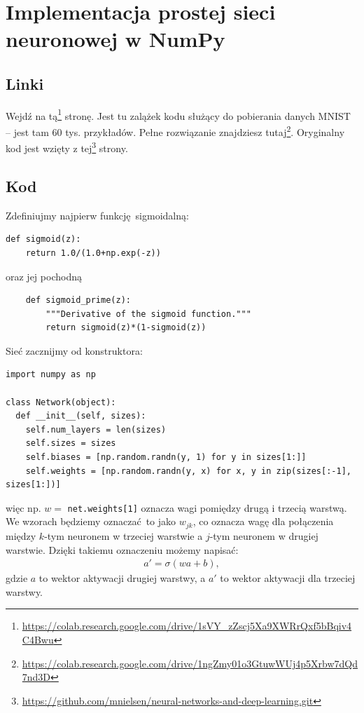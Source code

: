 \documentclass[10pt, oneside]{article}
\theoremstyle{remark}
\begin{document}
\section{Implementacja prostej sieci neuronowej w NumPy}
\subsection{Linki}
Wejdź na tą\footnote{\url{https://colab.research.google.com/drive/1sVY_zZscj5Xa9XWRrQxf5bBqiv4C4Bwu}} stronę. 
Jest tu zalążek kodu służący do pobierania danych MNIST -- jest tam 60 tys. przykładów.
Pełne rozwiązanie znajdziesz tutaj\footnote{\url{https://colab.research.google.com/drive/1ngZmy01o3GtuwWUj4p5Xrbw7dQd7nd3D}}.
Oryginalny kod jest wzięty z tej\footnote{\url{https://github.com/mnielsen/neural-networks-and-deep-learning.git}} strony.

\subsection{Kod}
Zdefiniujmy najpierw funkcję sigmoidalną:
\begin{verbatim}
def sigmoid(z):
    return 1.0/(1.0+np.exp(-z))
\end{verbatim}
oraz jej pochodną
\begin{verbatim}
    def sigmoid_prime(z):
        """Derivative of the sigmoid function."""
        return sigmoid(z)*(1-sigmoid(z))
\end{verbatim}
Sieć zacznijmy od konstruktora:
\begin{verbatim}
import numpy as np

class Network(object):
  def __init__(self, sizes):
    self.num_layers = len(sizes)
    self.sizes = sizes
    self.biases = [np.random.randn(y, 1) for y in sizes[1:]]
    self.weights = [np.random.randn(y, x) for x, y in zip(sizes[:-1], sizes[1:])]
\end{verbatim}
więc np. $w=$ \texttt{net.weights[1]} oznacza wagi pomiędzy drugą i trzecią warstwą.
We wzorach będziemy oznaczać to jako $w_{jk}$, co oznacza wagę dla połączenia między $k$-tym neuronem w trzeciej warstwie a $j$-tym neuronem w drugiej warstwie.
Dzięki takiemu oznaczeniu możemy napisać:
\begin{eqnarray} 
  a' = \sigma(w a + b),
\end{eqnarray}
gdzie $a$ to wektor aktywacji drugiej warstwy, a $a'$ to wektor aktywacji dla trzeciej warstwy.
\end{document}
